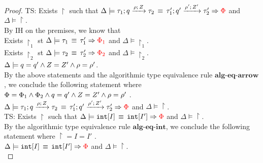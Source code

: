 \begin{proof}
 TS: Exists $\restriction$ such that $\Delta \models \eqv{\tarr{\type_1}{\type_2}{\nnatbiA}{\dmap}{\nnatA}   }{\tarr{\type_1'}{\type_2'}{\nnatbiA'}{\dmap'}{\nnatA'} }{ \restriction}$ and $\Delta \models \restriction$.    \\
 By IH on the premises, we know that \\
Exists $\restriction_1 $ st  $\Delta \models \eqv{\type_1   }{\type_1' }{ \restriction_1}$ and $\Delta \models \restriction_1$. \\
Exists $\restriction_2 $ st  $\Delta \models \eqv{\type_2 }{\type_2' }{ \restriction_2}$ and $\Delta \models \restriction_2$. \\
$\Delta \models \nnatbiA = \nnatbiA' \land \nnatA = \nnatA' \land \dmap = \dmap'$.\\
By the above statements and the algorithmic type equivalence rule $\textbf{alg-eq-arrow}$, we conclude the following statement where $\restriction = \restriction_1 \land \restriction_2 \land \nnatbiA = \nnatbiA' \land \nnatA = \nnatA' \land \dmap = \dmap'$ .\\
  $\Delta \models \eqv{\tarr{\type_1}{\type_2}{\nnatbiA}{\dmap}{\nnatA}   }{\tarr{\type_1'}{\type_2'}{\nnatbiA'}{\dmap'}{\nnatA'} }{ \restriction}$ and $\Delta \models \restriction$.    \\  
    
TS: Exists $\restriction$ such that $\Delta \models \eqv{\tint[I]   }{\tint[I'] }{ \restriction}$ and $\Delta \models \restriction$.\\
By the algorithmic type equivalence rule $\textbf{alg-eq-int}$, we conclude the following statement where $\restriction = I = I'$ .\\
$\Delta \models \eqv{\tint[I]   }{\tint[I'] }{ \restriction}$ and $\Delta \models \restriction$.\\
    

\end{proof}
